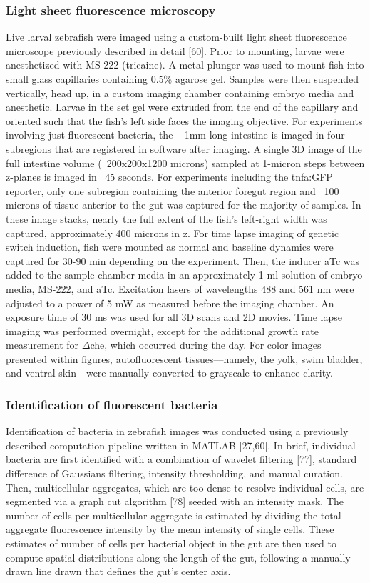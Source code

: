 \subsubsection{Light sheet fluorescence microscopy}
Live larval zebrafish were imaged using a custom-built light sheet fluorescence microscope previously described in detail [60]. Prior to mounting, larvae were anesthetized with MS-222 (tricaine). A metal plunger was used to mount fish into small glass capillaries containing 0.5\% agarose gel. Samples were then suspended vertically, head up, in a custom imaging chamber containing embryo media and anesthetic. Larvae in the set gel were extruded from the end of the capillary and oriented such that the fish's left side faces the imaging objective. For experiments involving just fluorescent bacteria, the ~ 1mm long intestine is imaged in four subregions that are registered in software after imaging. A single 3D image of the full intestine volume (~200x200x1200 microns) sampled at 1-micron steps between z-planes is imaged in ~45 seconds. For experiments including the tnfa:GFP reporter, only one subregion containing the anterior foregut region and ~100 microns of tissue anterior to the gut was captured for the majority of samples. In these image stacks, nearly the full extent of the fish's left-right width was captured, approximately 400 microns in z. For time lapse imaging of genetic switch induction, fish were mounted as normal and baseline dynamics were captured for 30-90 min depending on the experiment. Then, the inducer aTc was added to the sample chamber media in an approximately 1 ml solution of embryo media, MS-222, and aTc. Excitation lasers of wavelengths 488 and 561 nm were adjusted to a power of 5 mW as measured before the imaging chamber. An exposure time of 30 ms was used for all 3D scans and 2D movies. Time lapse imaging was performed overnight, except for the additional growth rate measurement for $\Delta$che, which occurred during the day. For color images presented within figures, autofluorescent tissues—namely, the yolk, swim bladder, and ventral skin—were manually converted to grayscale to enhance clarity.

\subsubsection{Identification of fluorescent bacteria}
Identification of bacteria in zebrafish images was conducted using a previously described computation pipeline written in MATLAB [27,60]. In brief, individual bacteria are first identified with a combination of wavelet filtering [77], standard difference of Gaussians filtering, intensity thresholding, and manual curation. Then, multicellular aggregates, which are too dense to resolve individual cells, are segmented via a graph cut algorithm [78] seeded with an intensity mask. The number of cells per multicellular aggregate is estimated by dividing the total aggregate fluorescence intensity by the mean intensity of single cells. These estimates of number of cells per bacterial object in the gut are then used to compute spatial distributions along the length of the gut, following a manually drawn line drawn that defines the gut's center axis.

